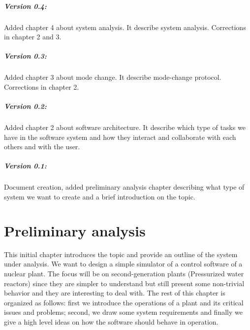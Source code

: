 \documentclass[10pt,a4paper]{report}
\begin{document}
\paragraph{Version 0.4:}
Added chapter 4 about system analysis. It describe system analysis. 
Corrections in chapter 2 and 3.

\paragraph{Version 0.3:}
Added chapter 3 about mode change. It describe mode-change protocol. 
Corrections in chapter 2.

\paragraph{Version 0.2:}
Added chapter 2 about software architecture. It describe which type of tasks we
have in the software system and how they interact and collaborate with each 
others and with the user. 

\paragraph{Version 0.1:} 
Document creation, added preliminary analysis chapter describing what type of 
system we want to create and a brief introduction on the topic. 

\newpage
\setcounter{page}{1}


\chapter{Preliminary analysis}
This initial chapter introduces the topic and provide an outline of the system 
under analysis. We want to design a simple simulator of a control software of a 
nuclear plant. The focus will be on second-generation plants (Pressurized water 
reactors) since they are simpler to understand but still present some 
non-trivial behavior and they are interesting to deal with. The rest of this 
chapter is organized as follows: first we  introduce the operations of a plant 
and its critical issues and problems; second, we draw some system requirements 
and finally we give a high level ideas on how the software should behave 
in operation.

\end{document}
